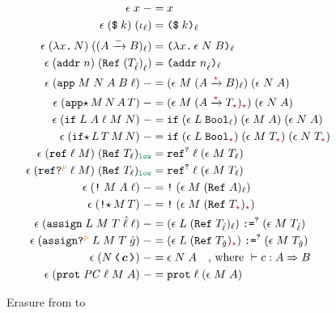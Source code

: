 \begin{figure}[tbp]
  \raggedright
  {\small
  \begin{align*}
  \epsilon\;x\;{-} &= x \\
  \epsilon\;(\ccconst{k})\;(\iota_\ell) &= \dynconst{k}{\ell} \\
  \epsilon\;(\cclam{x}{N})\;((\Fun{A}{-}{B})_{\ell}) &= \dynlam{x}{\epsilon\;N\;B}{\ell} \\
  \epsilon\;(\ccaddr{n})\;(\Refer{(T_{\hat{\ell}})}_{\ell}) &= \dynaddr{n_{\hat{\ell}}}{\ell} \\
  \epsilon\;(\ccapp{M}{N}{A}{B}{\ell})\;{-} &= (\epsilon\;M\;(\Fun{A}{\unk}{B})_\ell)\;(\epsilon\;N\;A) \\
  \epsilon\;(\ccappstar{M}{N}{A}{T}{})\;{-} &= (\epsilon\;M\;(\Fun{A}{\unk}{T_{\unk}})_{\unk})\;(\epsilon\;N\;A) \\
  \epsilon\;(\ccif{L}{A}{\ell}{M}{N})\;{-} &= \dynif{(\epsilon\;L\;\Bool_\ell)}{(\epsilon\;M\;A)}{(\epsilon\;N\;A)} \\
  \epsilon\;(\ccifstar{L}{T}{M}{N})\;{-} &= \dynif{(\epsilon\;L\;\Bool_{\unk})}{(\epsilon\;M\;T_{\unk})}{(\epsilon\;N\;T_{\unk})} \\
  \epsilon\;(\ccref{\ell}{M})\;(\Refer{T_\ell})_{\low} &= \dynref{?}{\ell}{(\epsilon\;M\;T_\ell)} \\
  \epsilon\;(\ccrefproj{\ell}{M}{p})\;(\Refer{T_\ell})_{\low} &= \dynref{?}{\ell}{(\epsilon\;M\;T_\ell)} \\
  \epsilon\;(\ccderef{M}{A}{\ell})\;{-} &= \dynderef{(\epsilon\;M\;(\Refer{A})_\ell)} \\
  \epsilon\;(\ccderefstar{M}{T})\;{-} &= \dynderef{(\epsilon\;M\;(\Refer{T_{\unk}})_{\unk})} \\
  \epsilon\;(\ccassign{L}{M}{T}{\hat{\ell}}{\ell})\;{-} &= \dynassign{(\epsilon\;L\;(\Refer{T_{\hat{\ell}}})_\ell)}{?}{(\epsilon\;M\;T_{\hat{\ell}})} \\
  \epsilon\;(\ccassignproj{L}{M}{T}{\hat{g}}{p})\;{-} &= \dynassign{(\epsilon\;L\;(\Refer{T_{\hat{g}}})_{\unk})}{?}{(\epsilon\;M\;T_{\hat{g}})} \\
  \epsilon\;(\cccast{N}{\bm{c}})\;{-} &= \epsilon\;N\;A \quad \text{, where }\vdash c : A \Rightarrow B \\
  \epsilon\;(\ccprot{\PC}{\ell}{M}{A})\;{-} &= \dynprot{\ell}{(\epsilon\;M\;A)}
  \end{align*}}
  \caption{Erasure from \CC to \DynIFC}
  \label{fig:cast-erase}
\end{figure}

